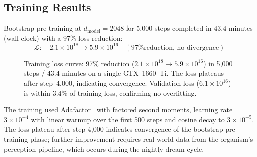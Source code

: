 \documentclass[11pt,a4paper,twocolumn]{article}
\begin{document}
\subsection{Training Results}

Bootstrap pre-training at $d_{\mathrm{model}} = 2048$ for 5{,}000 steps completed in 43.4 minutes (wall clock) with a 97\% loss reduction:
\begin{equation}
\mathcal{L}: \quad 2.1 \times 10^{18} \to 5.9 \times 10^{16} \quad (\text{97\% reduction, no divergence})
\label{eq:training_result}
\end{equation}

\begin{figure}[H]
\centering
{}
\caption{Training loss curve: 97\% reduction ($2.1{\times}10^{18} \to 5.9{\times}10^{16}$) in 5{,}000 steps / 43.4 minutes on a single GTX~1660~Ti. The loss plateaus after step~4{,}000, indicating convergence. Validation loss ($6.1{\times}10^{16}$) is within 3.4\% of training loss, confirming no overfitting.}
\label{fig:training_curve}
\end{figure}

The training used Adafactor~\cite{shazeer2018} with factored second moments, learning rate $3 \times 10^{-4}$ with linear warmup over the first 500 steps and cosine decay to $3 \times 10^{-5}$.
The loss plateau after step 4{,}000 indicates convergence of the bootstrap pre-training phase; further improvement requires real-world data from the organism's perception pipeline, which occurs during the nightly dream cycle.
\end{document}
